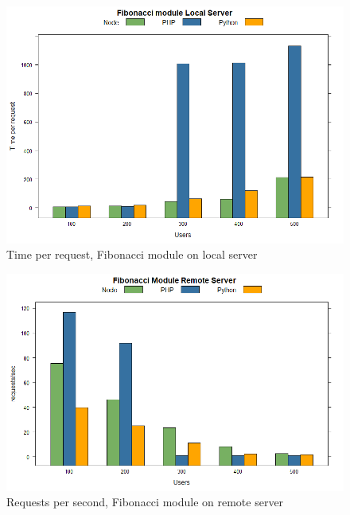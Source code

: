 \documentclass[../thesis.tex]{subfiles}
\begin{document}
	\begin{figure}[H]
		\centering
		\includegraphics[width=1\textwidth]{../images/fibLocaltpr.png}
		\caption{Time per request, Fibonacci module on local server}
		\label{rys1}
	\end{figure}
	\begin{figure}[H]
		\centering
		\includegraphics[width=1\textwidth]{../images/fibRemotereq.png}
		\caption{Requests per second, Fibonacci module on remote server}
		\label{rys1}
	\end{figure}
\end{document}
